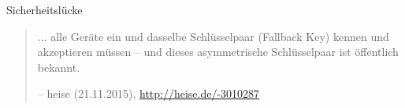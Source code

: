 \begin{frame}{Sicherheitslücke}
  \begin{quote}
    \normalsize
    ... alle Geräte ein und dasselbe Schlüsselpaar (Fallback Key) kennen
    und akzeptieren müssen – und dieses asymmetrische Schlüsselpaar ist
    öffentlich bekannt.
    \begin{flushright}
      \small
      -- heise (21.11.2015), \url{http://heise.de/-3010287}
    \end{flushright}
  \end{quote}
\end{frame}
